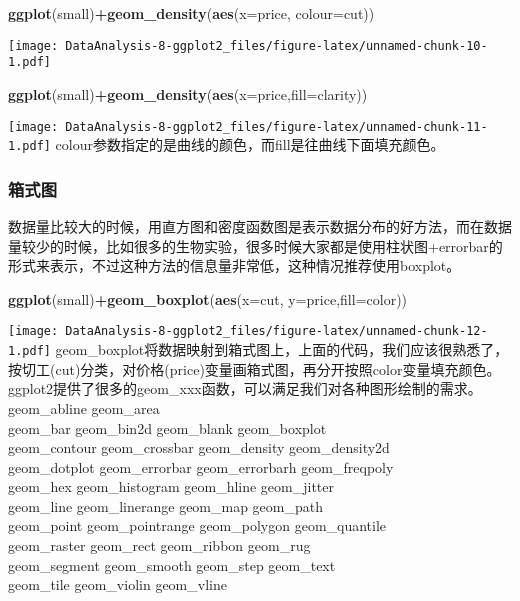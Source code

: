 \documentclass[]{article}
\newenvironment{Shaded}{\begin{snugshade}}{\end{snugshade}}
\newcommand{\KeywordTok}[1]{\textcolor[rgb]{0.13,0.29,0.53}{\textbf{#1}}}
\newcommand{\DataTypeTok}[1]{\textcolor[rgb]{0.13,0.29,0.53}{#1}}
\newcommand{\OperatorTok}[1]{\textcolor[rgb]{0.81,0.36,0.00}{\textbf{#1}}}
\newcommand{\NormalTok}[1]{#1}
\begin{document}
\begin{Shaded}
\begin{Highlighting}[]
\KeywordTok{ggplot}\NormalTok{(small)}\OperatorTok{+}\KeywordTok{geom_density}\NormalTok{(}\KeywordTok{aes}\NormalTok{(}\DataTypeTok{x=}\NormalTok{price, }\DataTypeTok{colour=}\NormalTok{cut))}
\end{Highlighting}
\end{Shaded}

\texttt{[image: DataAnalysis-8-ggplot2\_files/figure-latex/unnamed-chunk-10-1.pdf]}

\begin{Shaded}
\begin{Highlighting}[]
\KeywordTok{ggplot}\NormalTok{(small)}\OperatorTok{+}\KeywordTok{geom_density}\NormalTok{(}\KeywordTok{aes}\NormalTok{(}\DataTypeTok{x=}\NormalTok{price,}\DataTypeTok{fill=}\NormalTok{clarity))}
\end{Highlighting}
\end{Shaded}

\texttt{[image: DataAnalysis-8-ggplot2\_files/figure-latex/unnamed-chunk-11-1.pdf]}
colour参数指定的是曲线的颜色，而fill是往曲线下面填充颜色。

\subsubsection{箱式图}

数据量比较大的时候，用直方图和密度函数图是表示数据分布的好方法，而在数据量较少的时候，比如很多的生物实验，很多时候大家都是使用柱状图+errorbar的形式来表示，不过这种方法的信息量非常低，这种情况推荐使用boxplot。

\begin{Shaded}
\begin{Highlighting}[]
\KeywordTok{ggplot}\NormalTok{(small)}\OperatorTok{+}\KeywordTok{geom_boxplot}\NormalTok{(}\KeywordTok{aes}\NormalTok{(}\DataTypeTok{x=}\NormalTok{cut, }\DataTypeTok{y=}\NormalTok{price,}\DataTypeTok{fill=}\NormalTok{color))}
\end{Highlighting}
\end{Shaded}

\texttt{[image: DataAnalysis-8-ggplot2\_files/figure-latex/unnamed-chunk-12-1.pdf]}
geom\_boxplot将数据映射到箱式图上，上面的代码，我们应该很熟悉了，按切工(cut)分类，对价格(price)变量画箱式图，再分开按照color变量填充颜色。
ggplot2提供了很多的geom\_xxx函数，可以满足我们对各种图形绘制的需求。
geom\_abline geom\_area\\
geom\_bar geom\_bin2d geom\_blank geom\_boxplot\\
geom\_contour geom\_crossbar geom\_density geom\_density2d\\
geom\_dotplot geom\_errorbar geom\_errorbarh geom\_freqpoly\\
geom\_hex geom\_histogram geom\_hline geom\_jitter\\
geom\_line geom\_linerange geom\_map geom\_path\\
geom\_point geom\_pointrange geom\_polygon geom\_quantile\\
geom\_raster geom\_rect geom\_ribbon geom\_rug\\
geom\_segment geom\_smooth geom\_step geom\_text\\
geom\_tile geom\_violin geom\_vline
\end{document}
